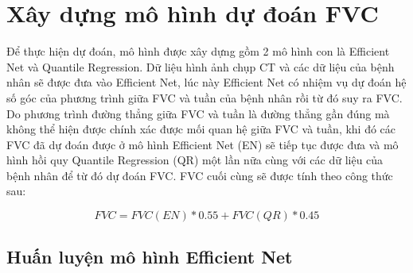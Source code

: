 \section{Xây dựng mô hình dự đoán FVC}
Để thực hiện dự đoán, mô hình được xây dựng gồm 2 mô hình con là Efficient Net và Quantile Regression. Dữ liệu hình ảnh chụp CT và các dữ liệu của bệnh nhân sẽ được đưa vào Efficient Net, lúc này Efficient Net có nhiệm vụ dự đoán hệ số góc của phương trình giữa FVC và tuần của bệnh nhân rồi từ đó suy ra FVC. Do phương trình đường thẳng giữa FVC và tuần là đường thẳng gần đúng mà không thể hiện được chính xác được mối quan hệ giữa FVC và tuần, khi đó các FVC đã dự đoán được ở mô hình Efficient Net (EN) sẽ tiếp tục được đưa và mô hình hồi quy Quantile Regression (QR) một lần nữa cùng với các dữ liệu của bệnh nhân để từ đó dự đoán FVC. FVC cuối cùng sẽ được tính theo công thức sau:\par
\begin{equation}
FVC= FVC(EN)*0.55 +FVC(QR)*0.45
\end{equation}
\subsection{Huấn luyện mô hình Efficient Net}
